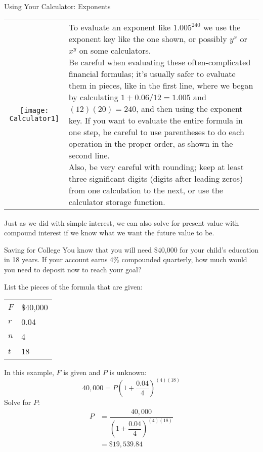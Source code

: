 \begin{proc}{Using Your Calculator: Exponents}
\begin{tabular}{c l}
\texttt{[image: Calculator1]} & \parbox[b]{3in}{To evaluate an exponent like $1.005^{240}$ we use the exponent key like the one shown, or possibly $\boxed{y^x}$ or $\boxed{x^y}$ on some calculators.\\

Be careful when evaluating these often-complicated financial formulas; it's usually safer to evaluate them in pieces, like in the first line, where we began by calculating $1+0.06/12 = 1.005$ and $(12)(20)=240$, and then using the exponent key.  If you want to evaluate the entire formula in one step, be careful to use parentheses to do each operation in the proper order, as shown in the second line.\\

Also, be very careful with rounding; keep at least three significant digits (digits after leading zeros) from one calculation to the next, or use the calculator storage function.}
\end{tabular}
\end{proc}
\vfill

Just as we did with simple interest, we can also solve for present value with compound interest if we know what we want the future value to be.
\vfill

\begin{example}[https://www.youtube.com/watch?v=pT9iEqWwQ-g&list=PLfmpjsIzhztsZtnb7HnXrQ8SLoiOCIcAM&index=17]{Saving for College}
You know that you will need \$40,000 for your child's education in 18 years.  If your account earns 4\% compounded quarterly, how much would you need to deposit now to reach your goal?

\sol
List the pieces of the formula that are given:
\begin{center}
\begin{tabular}{l l}
$F$ & \$40,000\\
$r$ & 0.04\\
$n$ & 4\\
$t$ & 18
\end{tabular}
\end{center}
In this example, $F$ is given and $P$ is unknown:
\[40,000 = P\left(1+\dfrac{0.04}{4}\right)^{(4)(18)}\]
Solve for $P$:
\begin{align*}
P &= \dfrac{40,000}{\left(1+\dfrac{0.04}{4}\right)^{(4)(18)}}\\
&= \boxed{\$19,539.84}
\end{align*}
\end{example}
\vfill

